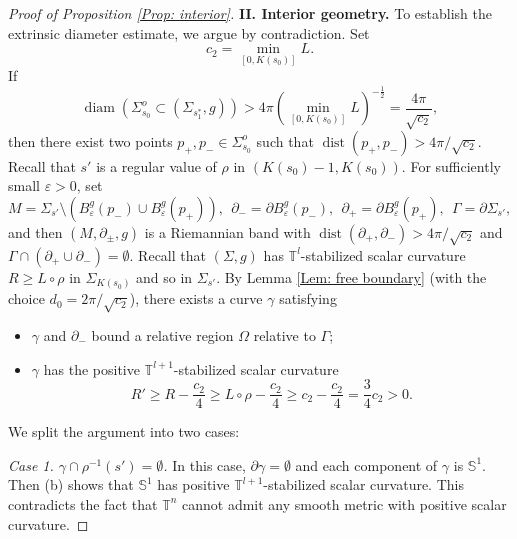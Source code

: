 \documentclass[10pt,a4paper]{amsart}
\newcommand{\de}{\partial}
\DeclareMathOperator{\diam}{diam}
\DeclareMathOperator{\dist}{dist}
\newcommand{\ve}{\varepsilon}
\begin{document}
\begin{proof}[Proof of Proposition \ref{Prop: interior}]
\bigskip
\noindent
{\bf II. Interior geometry.}
To establish the extrinsic diameter estimate, we argue by contradiction. Set
\[
c_2=\min_{[0,K(s_{0})]}L.
\]
If
\[
\diam(\Sigma_{s_0}^{o} \subset (\Sigma_{s_1^*},g)) > 4\pi \left(\min_{[0,K(s_{0})]}L\right)^{-\frac{1}{2}} = \frac{4\pi}{\sqrt{c_{2}}},
\]
then there exist two points $p_{+},p_{-}\in\Sigma_{s_0}^{o}$ such that $\dist(p_{+},p_{-})>4\pi/\sqrt{c_{2}}$. Recall that $s'$ is a regular value of $\rho$ in $(K(s_{0})-1,K(s_{0}))$. For sufficiently small $\ve>0$, set
\[
M = \Sigma_{s'}\setminus(B_{\ve}^{g}(p_{-})\cup B_{\ve}^{g}(p_{+})), \ \
\de_{-} = \de B_{\ve}^{g}(p_{-}), \ \
\de_{+} = \de B_{\ve}^{g}(p_{+}), \ \
\Gamma = \de\Sigma_{s'},
\]
and then $(M,\de_{\pm},g)$ is a Riemannian band with $\dist(\partial_+,\partial_-)>4\pi/\sqrt{c_{2}}$ and $\Gamma\cap(\de_{+}\cup\de_{-})=\emptyset$. Recall that $(\Sigma,g)$ has $\mathbb{T}^l$-stabilized scalar curvature $R\geq L\circ \rho$ in $\Sigma_{K(s_0)}$ and so in $\Sigma_{s'}$.
By Lemma \ref{Lem: free boundary} (with the choice $d_{0}=2\pi/\sqrt{c_{2}}$), there exists a curve $\gamma$ satisfying
\begin{itemize}\setlength{\itemsep}{1mm}
\item[(a)] $\gamma$ and $\partial_-$ bound a relative region $\Omega$ relative to $\Gamma$;
\item[(b)] $\gamma$ has the positive $\mathbb T^{l+1}$-stabilized scalar curvature
\[
R' \geq R-\frac{c_{2}}{4} \geq L\circ \rho-\frac{c_{2}}{4} \geq c_{2}-\frac{c_{2}}{4} = \frac{3}{4}c_{2} > 0.
\]
\end{itemize}
We split the argument into two cases:

\medskip

{\it Case 1. $\gamma\cap\rho^{-1}(s')=\emptyset$.} In this case, $\de\gamma=\emptyset$ and each component of $\gamma$ is $\mathbb{S}^{1}$. Then (b) shows that $\mathbb{S}^{1}$ has positive $\mathbb T^{l+1}$-stabilized scalar curvature. This contradicts the fact that $\mathbb{T}^{n}$ cannot admit any smooth metric with positive scalar curvature.

\medskip


\end{proof}
\end{document}
